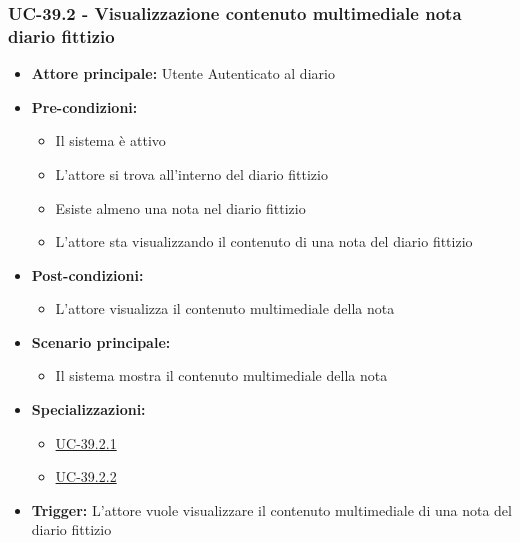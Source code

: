 \documentclass[a4paper,12pt]{article}
\begin{document}
\subsubsection{UC-39.2 - Visualizzazione contenuto multimediale nota diario fittizio} \label{subsec:UC-39.2}
\begin{itemize}
    \item \textbf{Attore principale:} Utente Autenticato al diario
    \item \textbf{Pre-condizioni:}
    \begin{itemize}
        \item Il sistema è attivo
        \item L'attore si trova all'interno del diario fittizio
        \item Esiste almeno una nota nel diario fittizio
        \item L'attore sta visualizzando il contenuto di una nota del diario fittizio
    \end{itemize}
    \item \textbf{Post-condizioni:}
    \begin{itemize}
        \item L'attore visualizza il contenuto multimediale della nota
    \end{itemize}
    \item \textbf{Scenario principale:}
    \begin{itemize}
        \item Il sistema mostra il contenuto multimediale della nota 
    \end{itemize}
    \item \textbf{Specializzazioni:}
    \begin{itemize}
        \item \hyperref[subsec:UC-39.2.1]{UC-39.2.1}
        \item \hyperref[subsec:UC-39.2.2]{UC-39.2.2}
    \end{itemize}
    \item \textbf{Trigger:} L'attore vuole visualizzare il contenuto multimediale di una nota del diario fittizio
\end{itemize}
\end{document}
